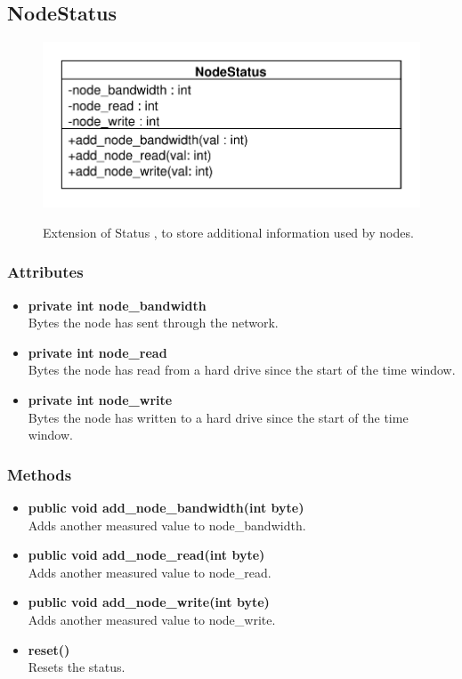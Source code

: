 \subsection{NodeStatus}
\begin{figure}[htbp]
	\begin{minipage}[t]{7cm}
		\vspace{0pt}
		\centering
		\includegraphics[scale=0.6]{./diagram_pictures/NodeInterface/NodeStatus.pdf}
	\end{minipage}
	\hfill
	\begin{minipage}[t]{7cm}
		\vspace{10pt}
		Extension of Status , to store additional information used by nodes.
	\end{minipage}
\end{figure}


\subsubsection{Attributes}
\begin{itemize}
	\item \textbf{private int node\_bandwidth}\\
	Bytes the node has sent through the network.
	\item \textbf{private int node\_read}\\
	Bytes the node has read from a hard drive since the start of the time window.
	\item \textbf{private int node\_write}\\
	Bytes the node has written to a hard drive since the start of the time window.
\end{itemize}

\subsubsection{Methods}
\begin{itemize}
	\item \textbf{public void add\_node\_bandwidth(int byte)}\\
	Adds another measured value  to node\_bandwidth.
	\item \textbf{public void add\_node\_read(int byte)}\\
	Adds another measured value to node\_read.
	\item \textbf{public void add\_node\_write(int byte)}\\
	Adds another measured value  to node\_write.
	\item \textbf{reset()}\\
	Resets the status.
\end{itemize}

